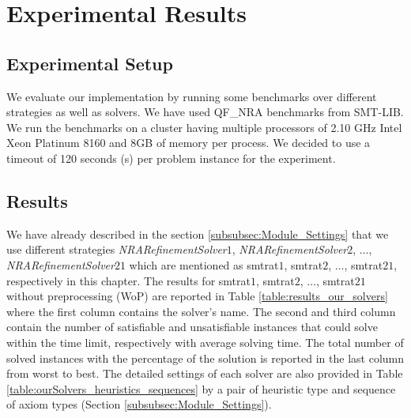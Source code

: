 \chapter{Experimental Results}
\label{chap:experimental_result}

\section{Experimental Setup}
We evaluate our implementation by running some benchmarks over different strategies as well as solvers.
We have used QF\_NRA benchmarks from SMT-LIB.
We run the benchmarks on a cluster having multiple processors of 2.10 GHz Intel Xeon Platinum 8160 and 8GB of memory per process.
We decided to use a timeout of 120 seconds (s) per problem instance for the experiment.

\section{Results}
We have already described in the section \ref{subsubsec:Module_Settings} that we use different strategies \textit{NRARefinementSolver$1$}, \textit{NRARefinementSolver$2$}, $\dots$, \textit{NRARefinementSolver$21$} which are mentioned as  smtrat$1$, smtrat$2$, $\dots$, smtrat$21$, respectively in this chapter. 
The results for smtrat$1$, smtrat$2$, $\dots$, smtrat$21$ without preprocessing (WoP) are reported in Table \ref{table:results_our_solvers} where the first column contains the solver's name.
The second and third column contain the number of satisfiable and unsatisfiable instances that could solve within the time limit, respectively with average solving time.
The total number of solved instances with the percentage of the solution is reported in the last column from worst to best.
The detailed settings of each solver are also provided in Table \ref{table:ourSolvers_heuristics_sequences} by a pair of heuristic type and sequence of axiom types (Section \ref{subsubsec:Module_Settings}).\newline

